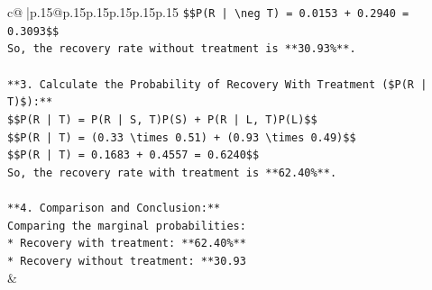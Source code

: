 \documentclass{article}
\begin{document}
{\begin{supertabular}{c@{$\;$}|p{.15\linewidth}@{}p{.15\linewidth}p{.15\linewidth}p{.15\linewidth}p{.15\linewidth}p{.15\linewidth}}
{{{\texttt{\$\$P(R | \textbackslash{}neg T) = 0.0153 + 0.2940 = 0.3093\$\$} \\
\texttt{So, the recovery rate without treatment is **30.93\%**.} \\
\\ 
\texttt{**3. Calculate the Probability of Recovery With Treatment (\$P(R | T)\$):**} \\
\texttt{\$\$P(R | T) = P(R | S, T)P(S) + P(R | L, T)P(L)\$\$} \\
\texttt{\$\$P(R | T) = (0.33 \textbackslash{}times 0.51) + (0.93 \textbackslash{}times 0.49)\$\$} \\
\texttt{\$\$P(R | T) = 0.1683 + 0.4557 = 0.6240\$\$} \\
\texttt{So, the recovery rate with treatment is **62.40\%**.} \\
\\ 
\texttt{**4. Comparison and Conclusion:**} \\
\texttt{Comparing the marginal probabilities:} \\
\texttt{*   Recovery with treatment: **62.40\%**} \\
\texttt{*   Recovery without treatment: **30.93} \\
            }
        }
    }
    & \\ \\


\end{supertabular}}
\end{document}
